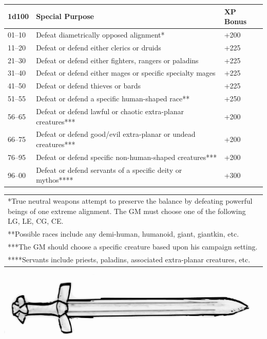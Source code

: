 \begin{multicols}{2}
\begin{minipage}{\columnwidth}
\label{specialpurpose}
\noindent \begin{tabular}{|p{}|p{}|p{}|}
\hline
1d100	& Special Purpose	& XP Bonus \\
\hline\hline
\rowcolor[gray]{0.9}01--10	& Defeat diametrically opposed alignment*	& +200 \\
11--20	& Defeat or defend either clerics or druids	& +225 \\
\rowcolor[gray]{0.9}21--30	& Defeat or defend either fighters, rangers or paladins	& +225 \\
31--40	& Defeat or defend either mages or specific specialty mages	& +225 \\
\rowcolor[gray]{0.9}41--50	& Defeat or defend thieves or bards	& +225 \\
51--55	& Defeat or defend a specific human-shaped race**	& +250 \\
\rowcolor[gray]{0.9}56--65	& Defeat or defend lawful or chaotic extra-planar creatures***	& +200 \\
66--75	& Defeat or defend good/evil extra-planar or undead creatures***	& +200 \\
\rowcolor[gray]{0.9}76--95	& Defeat or defend specific non-human-shaped creatures***	& +200 \\
96--00	& Defeat or defend servants of a specific deity or mythos****	& +300 \\
\hline
\end{tabular}
\noindent\begin{tabular}{p{}}
*True neutral weapons attempt to preserve the balance by defeating powerful beings of one extreme alignment.  The GM must choose one of the following LG, LE, CG, CE. \\
**Possible races include any demi-human, humanoid, giant, giantkin, etc. \\
***The GM should choose a specific creature based upon his campaign setting.  \\
****Servants include priests, paladins, associated extra-planar creatures, etc. \\
\end{tabular}\vspace{.5em}

\end{minipage}

\noindent\includegraphics[width=\columnwidth]{vikingsword.pdf}\label{vikingsword}


\end{multicols}
